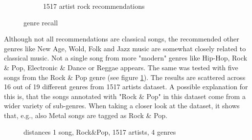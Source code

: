 \begin{figure}[htbp]
{{\begin{subfigure}{.495\textwidth}
				\caption{1517 artist rock recommendations}
				\label{fig:genrerec2}
			\end{subfigure}		
	}}
	\caption{genre recall}
	\label{fig:1517gen}
\end{figure}

\noindent Although not all recommendations are classical songs, the recommended other genres like New Age, Wold, Folk and Jazz music are somewhat closely related to classical music. Not a single song from more "modern" genres like Hip-Hop, Rock \& Pop, Electronic \& Dance or Reggae appears.
\noindent The same was tested with five songs from the Rock \& Pop genre (see figure \ref{fig:genrerec2}). The results are scattered across 16 out of 19 different genres from 1517 artists dataset. A possible explanation for this is, that the songs annotated with "Rock \& Pop" in this dataset come from a wider variety of sub-genres. When taking a closer look at the dataset, it shows that, e.g., also Metal songs are tagged as Rock \& Pop.\\
\begin{figure}[htbp]
	\centering
	\caption{distances 1 song, Rock\&Pop, 1517 artists, 4 genres}
	\label{fig:corr5}
\end{figure}
\FloatBarrier

